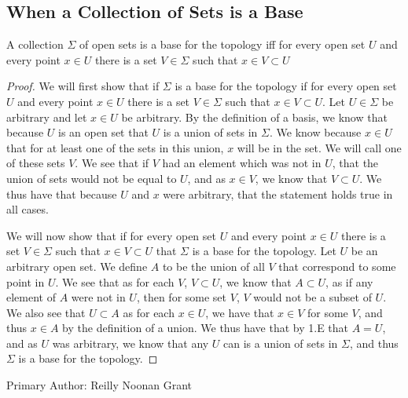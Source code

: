 \subsection{When a Collection of Sets is a Base}
\begin{majorEx}
  A collection $\Sigma$ of open sets is a base for the topology iff for
  every open set $U$ and every point $x\in U$  
there is a set $V \in
  \Sigma$ such that $x \in V \subset U$
\end{majorEx}
\begin{proof}
We will first show that if $\Sigma$ is a base for the  topology if for
every open set $U$ and every point $x \in U$ there is a set $V \in
\Sigma$ such that $x \in V \subset U$. Let $U\in \Sigma$ be arbitrary
and let $x\in U$ be arbitrary. By the definition of a basis, we know
that because $U$ is an open set that $U$ is a union of sets in $\Sigma
$. We know because $x \in U$ that for at least one of the sets in this
union, $x$ will be in the set. We will call one of these sets $V$.
We see that if $V$ had an
element which was not in $U$, that the union of sets would not be
equal to $U$, and as $x\in V$, we know that $V\subset U$. We thus have
that because $U$ and $x$ were arbitrary, that the statement holds true
in all cases.

We will now show that if for every open set $U$ and every point $x\in U$  
there is a set $V \in \Sigma$ such that $x \in V \subset U$ that
$\Sigma$ is a base for the topology. Let $U$ be an arbitrary open
set. We define $A$ to be the union of all $V$ that correspond to some
point in $U$. We see that as for each $V$, $V \subset U$, we know that
$A \subset U$, as if any element of $A$ were not in $U$, then for some
set $V$, $V$ would not be a subset of $U$. We also see that $U\subset
A$ as for each $x\in U$, we have that $x\in V$ for some $V$, and thus
$x\in A$ by the definition of a union. We thus have that by 1.E that
$A= U$, and as $U$ was arbitrary, we know that any $U$ can is a union
of sets in $\Sigma$, and thus $\Sigma$ is a base for the topology.
\end{proof}

Primary Author: Reilly Noonan Grant

